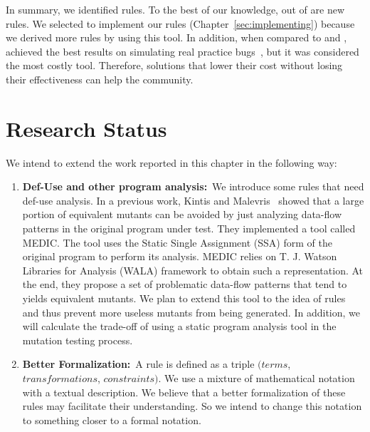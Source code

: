 


In summary, we identified \NumberOfIdentifiedHeuristics rules. 
To the best of our knowledge, \NumberOfNewHeuristics out of \NumberOfIdentifiedHeuristics are new rules. 
We selected \mujava{} to implement our rules (Chapter~\ref{sec:implementing}) because we derived more rules by using this tool. In addition, when compared to \major{} and \pit{}, \mujava{} achieved the best results on simulating real practice bugs~\cite{KINTIS:2016:1}, but it was considered the most costly tool.
Therefore, solutions that lower their cost without losing their effectiveness can help the community.

\section{Research Status}
We intend to extend the work reported in this chapter in the following way:

\begin{enumerate}
    \item \textbf{Def-Use and other program analysis:}~We introduce some rules that need def-use analysis. In a previous work, Kintis and Malevris~\cite{KINTIS:2015:1} showed that a large portion of equivalent mutants can be avoided by just analyzing data-flow patterns in the original program under test. They implemented a tool called MEDIC. The tool uses the Static Single Assignment (SSA) \cite{ALPERN:1988:1} form of the original program to perform its analysis. MEDIC relies on T. J. Watson Libraries for Analysis (WALA) \cite{WALA:2017} framework to obtain such a representation. At the end, they propose a set of problematic data-flow patterns that tend to yields equivalent mutants. We plan to extend this tool to the idea of rules and thus prevent more useless mutants from being generated. In addition, we will calculate the trade-off of using a static program analysis tool in the mutation testing process.
    \item \textbf{Better Formalization:}~A rule is defined as a triple $(terms$, $ transformations$, $ constraints)$. We use a mixture of mathematical notation with a textual description. We believe that a better formalization of these rules may facilitate their understanding. So we intend to change this notation to something closer to a formal notation.
\end{enumerate}


